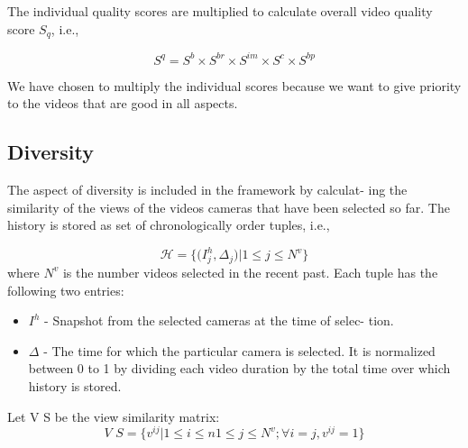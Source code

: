 \documentclass[conference]{IEEEtran}
\begin{document}
The individual quality scores are multiplied to calculate overall
video quality score $S_q$, i.e.,

\begin{equation}
S^q = S^b\times S^{br}\times S^{im}\times S^c\times S^{bp}
\end{equation}

We have chosen to multiply the individual scores because we
want to give priority to the videos that are good in all aspects.

\subsection{Diversity}
The aspect of diversity is included in the framework by calculat-
ing the similarity of the views of the videos cameras that have been selected
so far. The history is stored as set of chronologically order tuples,
i.e.,


\begin{equation}
\mathcal{H} = \big\{\big(I_j^h,\Delta_j \big)|1\leq j\leq N^v\big\}
\end{equation}
where ${N^v}$ is the number videos selected in the recent past. Each
tuple has the following two entries:
\begin{itemize}
    \item ${I^h}$ - Snapshot from the selected cameras at the time of selec-
tion.
    \item $\Delta$ - The time for which the particular camera is selected. It
is normalized between 0 to 1 by dividing each video duration
by the total time over which history is stored.
\end{itemize}

Let V S be the view similarity matrix:
\begin{equation}
\textit{V S} = \big\{v^{ij}|1\leq i\leq n 1\leq j\leq N^v;\forall i=j,v^{ij}=1 \big\}
\end{equation}
\end{document}
